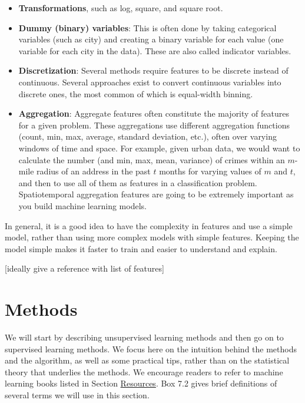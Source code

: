 \documentclass[]{krantz}
\begin{document}
\begin{itemize}
\item
  \textbf{Transformations}, such as log, square, and square root.
\item
  \textbf{Dummy (binary) variables}: This is often done by taking
  categorical variables (such as city) and creating a binary variable
  for each value (one variable for each city in the data). These are
  also called indicator variables.
\item
  \textbf{Discretization}: Several methods require features to be
  discrete instead of continuous. Several approaches exist to convert
  continuous variables into discrete ones, the most common of which is
  equal-width binning.
\item
  \textbf{Aggregation}: Aggregate features often constitute the majority
  of features for a given problem. These aggregations use different
  aggregation functions (count, min, max, average, standard deviation,
  etc.), often over varying windows of time and space. For example,
  given urban data, we would want to calculate the number (and min, max,
  mean, variance) of crimes within an \(m\)-mile radius of an address in
  the past \(t\) months for varying values of \(m\) and \(t\), and then
  to use all of them as features in a classification problem.
  Spatiotemporal aggregation features are going to be extremely
  important as you build machine learning models.
\end{itemize}

In general, it is a good idea to have the complexity in features and use
a simple model, rather than using more complex models with simple
features. Keeping the model simple makes it faster to train and easier
to understand and explain.

{[}ideally give a reference with list of features{]}

\section{Methods}\label{methods}

We will start by describing unsupervised learning methods and then go on
to supervised learning methods. We focus here on the intuition behind
the methods and the algorithm, as well as some practical tips, rather
than on the statistical theory that underlies the methods. We encourage
readers to refer to machine learning books listed in Section
\protect\hyperlink{ml:res}{Resources}. Box 7.2 gives brief definitions
of several terms we will use in this section.
\end{document}

